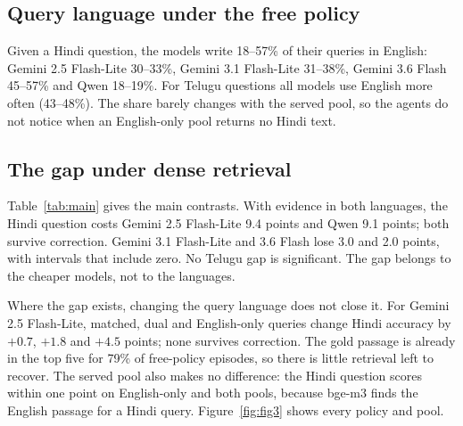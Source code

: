 \subsection{Query language under the free policy}
\label{sec:results-drift}
Given a Hindi question, the models write 18--57\% of their queries in English: Gemini 2.5 Flash-Lite 30--33\%, Gemini 3.1 Flash-Lite 31--38\%, Gemini 3.6 Flash 45--57\% and Qwen 18--19\%. For Telugu questions all models use English more often (43--48\%). The share barely changes with the served pool, so the agents do not notice when an English-only pool returns no Hindi text.

\subsection{The gap under dense retrieval}
\label{sec:results-qg}
Table~\ref{tab:main} gives the main contrasts. With evidence in both languages, the Hindi question costs Gemini 2.5 Flash-Lite 9.4 points and Qwen 9.1 points; both survive correction. Gemini 3.1 Flash-Lite and 3.6 Flash lose 3.0 and 2.0 points, with intervals that include zero. No Telugu gap is significant. The gap belongs to the cheaper models, not to the languages.

Where the gap exists, changing the query language does not close it. For Gemini 2.5 Flash-Lite, matched, dual and English-only queries change Hindi accuracy by $+0.7$, $+1.8$ and $+4.5$ points; none survives correction. The gold passage is already in the top five for 79\% of free-policy episodes, so there is little retrieval left to recover. The served pool also makes no difference: the Hindi question scores within one point on English-only and both pools, because bge-m3 finds the English passage for a Hindi query. Figure~\ref{fig:fig3} shows every policy and pool.

